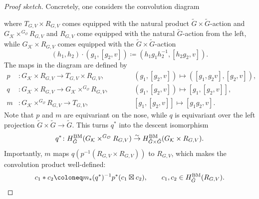 \begin{proof}[Proof sketch]
	Concretely, one considers the convolution diagram
	\begin{center}
	\end{center}
	where $T_{G,V} \times R_{G,V}$ comes equipped with the natural product $\tilde G \times \tilde G$-action and $G_\mathcal{K} \times^{G_\mathcal{O}} R_{G,V}$ and $R_{G,V}$ come equipped with the natural $\tilde G$-action from the left, while $G_\mathcal{K} \times R_{G,V}$ comes equipped with the $\tilde G \times \tilde G$-action
	\begin{equation}
		(h_1,h_2) \cdot (g_1,[g_2,v]) \coloneq (h_1 g_1 h_2^{-1},[h_2 g_2,v]).
	\end{equation}		
	The maps in the diagram are defined by
	\begin{align}
		p &\colon G_\mathcal{K} \times R_{G,V} \to T_{G,V} \times R_{G,V}, \qquad && (g_1,[g_2,v]) \mapsto ([g_1,g_2 v],[g_2,v]), \\
		q &\colon G_\mathcal{K} \times R_{G,V} \to G_\mathcal{K} \times^{G_\mathcal{O}} R_{G,V}, \qquad && (g_1,[g_2,v]) \mapsto [g_1,[g_2,v]], \\
		m &\colon G_\mathcal{K} \times^{G_\mathcal{O}} R_{G,V} \to T_{G,V}, \qquad && [g_1,[g_2,v]] \mapsto [g_1 g_2,v].
	\end{align}
	Note that $p$ and $m$ are equivariant on the nose, while $q$ is equivariant over the left projection $\tilde G \times \tilde G \to \tilde G$. This turns $q^*$ into the descent isomorphism
	\begin{equation}
		q^* \colon H_{\tilde G}^\textup{BM}(G_\mathcal{K} \times^{G_\mathcal{O}} R_{G,V}) \overset \sim \to H_{\tilde G \times \tilde G}^\textup{BM}(G_\mathcal{K} \times R_{G,V}).
	\end{equation}
	Importantly, $m$ maps $q(p^{-1}(R_{G,V} \times R_{G,V}))$ to $R_{G,V}$, which makes the convolution product well-defined:
	\begin{equation}
		c_1 * c_2 \coloneq m_* (q^*)^{-1} p^*(c_1 \boxtimes c_2), \qquad c_1,c_2 \in H_{\tilde G}^\textup{BM}(R_{G,V}).
	\end{equation}
\end{proof}

